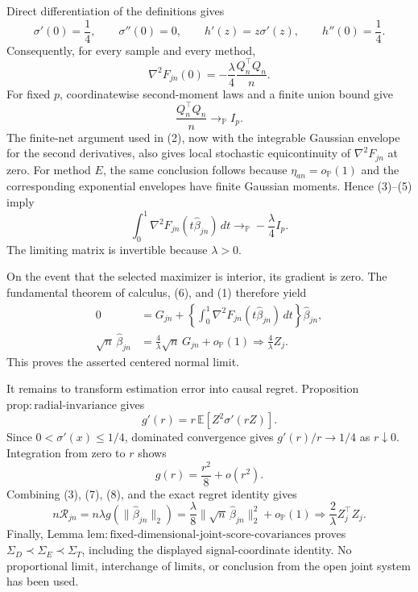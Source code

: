 Direct differentiation of the definitions gives
\[
 \sigma'(0)=\frac14,
 \qquad \sigma''(0)=0,
 \qquad h'(z)=z\sigma'(z),
 \qquad h''(0)=\frac14.
\]
Consequently, for every sample and every method,
\[
 \nabla^2F_{jn}(0)
 =-\frac\lambda4\frac{Q_n^\top Q_n}{n}.
 \tag{4}
\]
For fixed \(p\), coordinatewise second-moment laws and a finite union bound give
\[
 \frac{Q_n^\top Q_n}{n}\longrightarrow_{\mathbb P}I_p.
 \tag{5}
\]
The finite-net argument used in (2), now with the integrable Gaussian envelope for the second derivatives, also gives local stochastic equicontinuity of \(\nabla^2F_{jn}\) at zero.  For method \(E\), the same conclusion follows because \(\eta_{an}=o_{\mathbb P}(1)\) and the corresponding exponential envelopes have finite Gaussian moments.  Hence (3)--(5) imply
\[
 \int_0^1\nabla^2F_{jn}(t\widehat\beta_{jn})\,dt
 \longrightarrow_{\mathbb P}-\frac\lambda4 I_p.
 \tag{6}
\]
The limiting matrix is invertible because \(\lambda>0\).

On the event that the selected maximizer is interior, its gradient is zero.  The fundamental theorem of calculus, (6), and (1) therefore yield
\[
 \begin{aligned}
 0
 &=G_{jn}+\left\{\int_0^1\nabla^2F_{jn}
       (t\widehat\beta_{jn})\,dt\right\}\widehat\beta_{jn},\\
 \sqrt n\,\widehat\beta_{jn}
 &=\frac4\lambda\sqrt n\,G_{jn}+o_{\mathbb P}(1)
 \Rightarrow \frac4\lambda Z_j.
 \end{aligned}
 \tag{7}
\]
This proves the asserted centered normal limit.

It remains to transform estimation error into causal regret.  Proposition \(\mathrm{prop{:}radial\mbox{-}invariance}\) gives
\[
 g'(r)=r\,\mathbb E[Z^2\sigma'(rZ)].
\]
Since \(0<\sigma'(x)\le1/4\), dominated convergence gives \(g'(r)/r\to1/4\) as \(r\downarrow0\).  Integration from zero to \(r\) shows
\[
 g(r)=\frac{r^2}{8}+o(r^2).
 \tag{8}
\]
Combining (3), (7), (8), and the exact regret identity gives
\[
 n\mathcal R_{jn}
 =n\lambda g(\|\widehat\beta_{jn}\|_2)
 =\frac\lambda8\|\sqrt n\,\widehat\beta_{jn}\|_2^2+o_{\mathbb P}(1)
 \Rightarrow \frac2\lambda Z_j^\top Z_j.
\]
Finally, Lemma \(\mathrm{lem{:}fixed\mbox{-}dimensional\mbox{-}joint\mbox{-}score\mbox{-}covariances}\) proves \(\Sigma_D\prec\Sigma_E\prec\Sigma_T\), including the displayed signal-coordinate identity.  No proportional limit, interchange of limits, or conclusion from the open joint system has been used.

